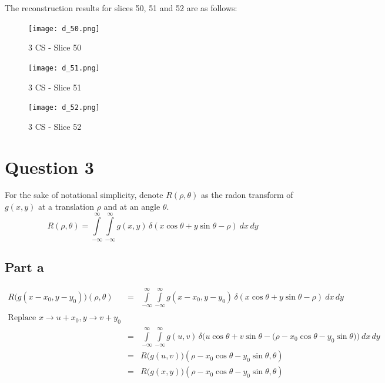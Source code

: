 \documentclass[12pt]{article}
\begin{document}
The reconstruction results for slices 50, 51 and 52 are as follows:
\begin{figure}[ht]
	\centering
	\begin{minipage}[bt]{0.3\linewidth}
		\centering
		\texttt{[image: d\_50.png]}
		\caption{3 CS - Slice 50}
	\end{minipage}
	\begin{minipage}[bt]{0.3\linewidth}
		\centering
		\texttt{[image: d\_51.png]}
		\caption{3 CS - Slice 51}
	\end{minipage}
\begin{minipage}[bt]{0.3\linewidth}
	\centering
	\texttt{[image: d\_52.png]}
	\caption{3 CS - Slice 52}
\end{minipage}
\end{figure}
\section*{Question 3}
For the sake of notational simplicity, denote $R(\rho, \theta)$ as the radon transform of $g(x, y)$ at a translation $\rho$ and at an angle $\theta$.
$$R(\rho, \theta) = \int\limits_{-\infty}^\infty \int \limits_{-\infty}^\infty g(x, y) \, \delta(x \cos\theta  + y \sin \theta - \rho)\: dx\,dy$$
\subsection*{Part a}
\begin{eqnarray*}
R\big(g(x-x_0, y-y_0)\big)(\rho, \theta) &=& \int\limits_{-\infty}^\infty \int \limits_{-\infty}^\infty g(x-x_0, y-y_0)\,\delta(x \cos\theta  + y \sin \theta - \rho)\: dx\,dy\\\\
\text{Replace } x \rightarrow u+x_0, y \rightarrow v+y_0&&\\
&=& \int\limits_{-\infty}^\infty \int \limits_{-\infty}^\infty g(u, v)\, \delta\bigg(u\cos \theta + v \sin\theta - \big(\rho - x_0\cos\theta - y_0\sin\theta\big)\bigg)\: dx\,dy\\
&=& R\big(g(u, v)\big)(\rho - x_0\cos\theta - y_0\sin\theta, \theta)\\
&=& R\big(g(x, y)\big)(\rho - x_0\cos\theta - y_0\sin\theta, \theta)
\end{eqnarray*}
\end{document}
